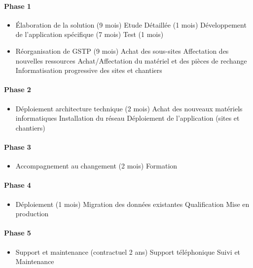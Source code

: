         \paragraph{Phase 1}
        \begin{itemize}
			\item Élaboration de la solution (9 mois)
				\subitem Etude Détaillée (1 mois)
				\subitem Développement de l’application spécifique (7 mois)
				\subitem Test (1 mois)
			\item Réorganisation de GSTP (9 mois)
				\subitem Achat des sous-sites
				\subitem Affectation des nouvelles ressources
				\subitem Achat/Affectation du matériel et des pièces de rechange
				\subitem Informatisation progressive des sites et chantiers
	    \end{itemize}

		\paragraph{Phase 2}
		\begin{itemize} 
			\item Déploiement architecture technique (2 mois)
				\subitem Achat des nouveaux matériels informatiques
				\subitem Installation du réseau
				\subitem Déploiement de l'application (sites et chantiers)
		\end{itemize}

		\paragraph{Phase 3}
		\begin{itemize} 
			\item Accompagnement au changement (2 mois)
				\subitem Formation
		\end{itemize}

		\paragraph{Phase 4}
		\begin{itemize} 
			\item Déploiement (1 mois)
				\subitem Migration des données existantes
				\subitem Qualification
				\subitem Mise en production
		\end{itemize}

		\paragraph{Phase 5}
		\begin{itemize} 
			\item Support et maintenance (contractuel  2 ans)
				\subitem Support téléphonique
				\subitem Suivi et Maintenance
		\end{itemize}

